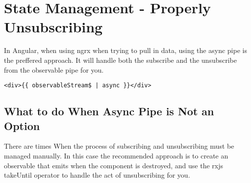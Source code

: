 \maketitle{}
\section{ State Management - Properly Unsubscribing }

In Angular, when using ngrx when trying to pull in data, using the async pipe is
the preffered approach. It will handle both the subscribe and the unsubscribe
from the observable pipe for you.

\begin{lstlisting}
<div>{{ observableStream$ | async }}</div>
\end{lstlisting}

\subsection{ What to do When Async Pipe is Not an Option }
There are times When the process of subscribing and unsubscribing must be
managed manually. In this case the recommended approach is to create an
observable that emits when the component is destroyed, and use the rxjs
takeUntil operator to handle the act of unsubscribing for you.
